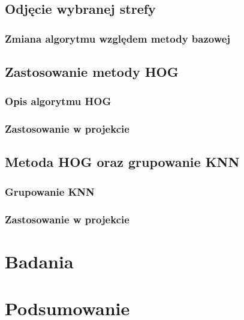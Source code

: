 \documentclass[a4paper,twoside,12pt]{book}
\newcounter{stronyPozaNumeracja}
\begin{document}
\section{Odjęcie wybranej strefy}

\subsection{Zmiana algorytmu względem metody bazowej}

\section{Zastosowanie metody HOG}
\subsection{Opis algorytmu HOG}
\subsection{Zastosowanie w projekcie}

\section{Metoda HOG oraz grupowanie KNN}
\subsection{Grupowanie KNN}
\subsection{Zastosowanie w projekcie}

\chapter{Badania}

\chapter{Podsumowanie}



\backmatter
{}
\setcounter{page}{\value{stronyPozaNumeracja}}

\pagestyle{tylkoNumeryStron}



\end{document}
